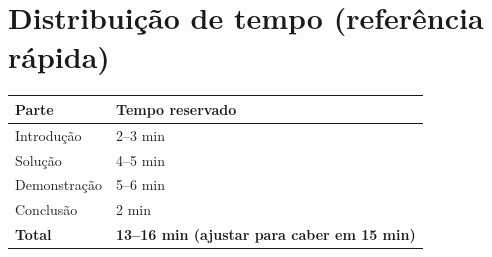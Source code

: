 \documentclass[12pt,a4paper]{report}
\begin{document}
\section{Distribuição de tempo (referência rápida)}
\begin{tabularx}{\textwidth}{p{} X}
\toprule
Parte & Tempo reservado\\
\midrule
Introdução & 2–3 min\\
Solução & 4–5 min\\
Demonstração & 5–6 min\\
Conclusão & 2 min\\
\midrule
\textbf{Total} & \textbf{13–16 min (ajustar para caber em 15 min)}\\
\bottomrule
\end{tabularx}
\end{document}
